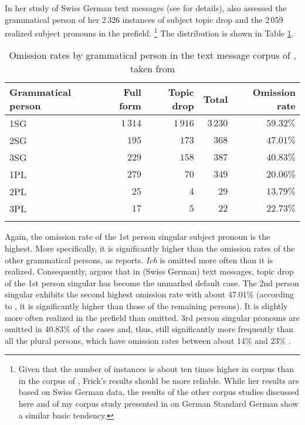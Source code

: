 \subsubsection{\citet{frick2017}}
In her study of Swiss German text messages (see  for details), \citet{frick2017} also assessed the grammatical person of her 2\,326 instances of subject topic drop and the 2\,059 realized subject pronouns in the prefield.%
\footnote{Given that the number of instances is about ten times higher in  corpus than in the corpus of \citet{androutsopoulos.schmidt2002}, Frick's results should be more reliable.
While her results are based on Swiss German data, the results of the other corpus studies discussed here and of my corpus study presented in  on German Standard German show a similar basic tendency.
}
The distribution is shown in Table \ref{tab:frick.person}.

\begin{table}
\caption[Omission rates by pronoun from \citet{frick2017}]{Omission rates by grammatical person in the text message corpus of \citet{frick2017}, taken from \citet[88]{frick2017}}
\centering
\begin{tabular}{lrrrr}
\lsptoprule
Grammatical person & Full form & Topic drop & Total & Omission rate \\
\midrule
1SG & $1\,314$ & $1\,916$ & $3\,230$ & $59.32\%$\\
2SG & $195$ & $173$ & $368$ & $47.01\%$\\
3SG & $229$ & $158$ & $387$ & $40.83\%$\\
1PL & $279$ & $70$ & $349$ & $20.06\%$\\
2PL & $25$ & $4$ & $29$ & $13.79\%$\\
3PL & $17$ & $5$ & $22$ & $22.73\%$\\
\lspbottomrule
\end{tabular}
\label{tab:frick.person}
\end{table}

\noindent
Again, the omission rate of the 1st person singular subject pronoun is the highest.
More specifically, it is significantly higher than the omission rates of the other grammatical persons, as \citet[90, footnote 102]{frick2017} reports.
\textit{Ich} is omitted more often than it is realized.
Consequently, \citet[89]{frick2017} argues that in (Swiss German) text messages, topic drop of the 1st person singular has become the unmarked default case.
The 2nd person singular exhibits the second highest omission rate with about 47.01\% (according to \cite[90, footnote 102]{frick2017}, it is significantly higher than those of the remaining persons).
It is slightly more often realized in the prefield than omitted.
3rd person singular pronouns are omitted in 40.83\% of the cases and, thus, still significantly more frequently than all the plural persons, which have omission rates between about 14\% and 23\% \citep[90, footnote 102]{frick2017}.

